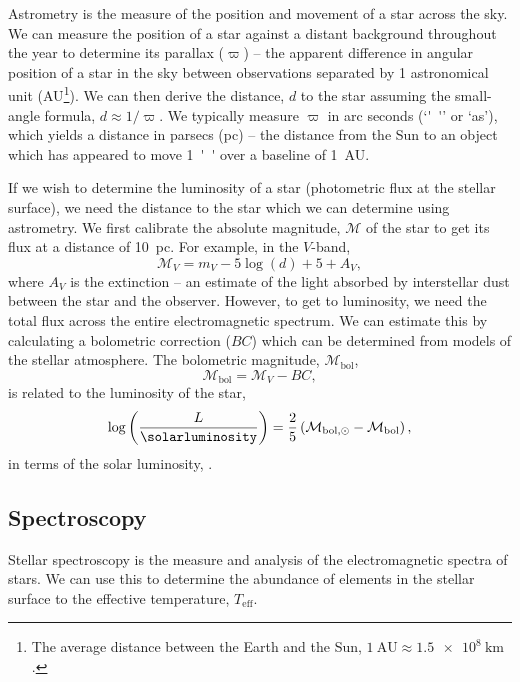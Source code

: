 Astrometry is the measure of the position and movement of a star across the sky. We can measure the position of a star against a distant background throughout the year to determine its parallax ($\varpi$) -- the apparent difference in angular position of a star in the sky between observations separated by 1 astronomical unit (AU\footnote{The average distance between the Earth and the Sun, $\SI{1}{\mathrm{AU}} \approx \SI{1.5e8}{\kilo\meter}$.}). We can then derive the distance, $d$ to the star assuming the small-angle formula, $d \approx 1/\varpi$. We typically measure $\varpi$ in arc seconds (`\si{''}' or `as'), which yields a distance in parsecs (pc) -- the distance from the Sun to an object which has appeared to move \SI{1}{''} over a baseline of \SI{1}{AU}.

If we wish to determine the luminosity of a star (photometric flux at the stellar surface), we need the distance to the star which we can determine using astrometry. We first calibrate the absolute magnitude, $\mathcal{M}$ of the star to get its flux at a distance of \SI{10}{pc}. For example, in the $V$-band,
\begin{equation}
    \mathcal{M}_V = m_V - 5 \log(d) + 5 + A_V,
\end{equation}
where $A_V$ is the extinction -- an estimate of the light absorbed by interstellar dust between the star and the observer. However, to get to luminosity, we need the total flux across the entire electromagnetic spectrum. We can estimate this by calculating a bolometric correction ($BC$) which can be determined from models of the stellar atmosphere. The bolometric magnitude, $\mathcal{M}_\mathrm{bol}$,
\begin{equation}
    \mathcal{M}_\mathrm{bol} = \mathcal{M}_V - BC,
\end{equation}
is related to the luminosity of the star,
\begin{equation}
    \log\left(\frac{L}{\si{\solarluminosity}}\right) = \frac{2}{5}\left(\mathcal{M}_{\mathrm{bol}, \odot}-\mathcal{M}_{\mathrm{bol}}\right),
\end{equation}
in terms of the solar luminosity, \si{\solarluminosity}.

\subsection{Spectroscopy}

Stellar spectroscopy is the measure and analysis of the electromagnetic spectra of stars. We can use this to determine the abundance of elements in the stellar surface to the effective temperature, $T_\mathrm{eff}$.

